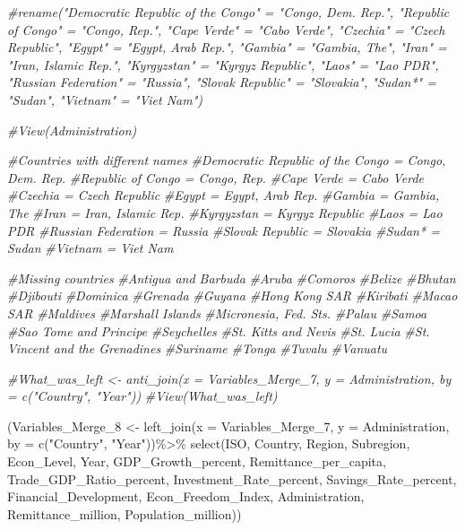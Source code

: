 \documentclass[
]{article}
\newenvironment{Shaded}{\begin{snugshade}}{\end{snugshade}}
\newcommand{\AttributeTok}[1]{\textcolor[rgb]{0.77,0.63,0.00}{#1}}
\newcommand{\CommentTok}[1]{\textcolor[rgb]{0.56,0.35,0.01}{\textit{#1}}}
\newcommand{\FunctionTok}[1]{\textcolor[rgb]{0.00,0.00,0.00}{#1}}
\newcommand{\NormalTok}[1]{#1}
\newcommand{\OtherTok}[1]{\textcolor[rgb]{0.56,0.35,0.01}{#1}}
\newcommand{\SpecialCharTok}[1]{\textcolor[rgb]{0.00,0.00,0.00}{#1}}
\newcommand{\StringTok}[1]{\textcolor[rgb]{0.31,0.60,0.02}{#1}}
\begin{document}
\begin{Shaded}
\begin{Highlighting}[]
\CommentTok{\#rename("Democratic Republic of the Congo" = "Congo, Dem. Rep.", "Republic of Congo" = "Congo, Rep.", "Cape Verde" = "Cabo Verde", "Czechia" = "Czech Republic", "Egypt" = "Egypt, Arab Rep.", "Gambia" = "Gambia, The", "Iran" = "Iran, Islamic Rep.", "Kyrgyzstan" = "Kyrgyz Republic", "Laos" = "Lao PDR", "Russian Federation" = "Russia", "Slovak Republic" = "Slovakia", "Sudan*" = "Sudan", "Vietnam" = "Viet Nam")}


\CommentTok{\#View(Administration)}


\CommentTok{\#Countries with different names}
\CommentTok{\#Democratic Republic of the Congo = Congo, Dem. Rep.}
\CommentTok{\#Republic of Congo = Congo, Rep.}
\CommentTok{\#Cape Verde = Cabo Verde}
\CommentTok{\#Czechia = Czech Republic}
\CommentTok{\#Egypt = Egypt, Arab Rep.}
\CommentTok{\#Gambia = Gambia, The}
\CommentTok{\#Iran = Iran, Islamic Rep.}
\CommentTok{\#Kyrgyzstan = Kyrgyz Republic}
\CommentTok{\#Laos = Lao PDR}
\CommentTok{\#Russian Federation = Russia}
\CommentTok{\#Slovak Republic = Slovakia}
\CommentTok{\#Sudan* = Sudan}
\CommentTok{\#Vietnam = Viet Nam}





\CommentTok{\#Missing countries}
\CommentTok{\#Antigua and Barbuda}
\CommentTok{\#Aruba}
\CommentTok{\#Comoros}
\CommentTok{\#Belize}
\CommentTok{\#Bhutan}
\CommentTok{\#Djibouti}
\CommentTok{\#Dominica}
\CommentTok{\#Grenada}
\CommentTok{\#Guyana}
\CommentTok{\#Hong Kong SAR}
\CommentTok{\#Kiribati}
\CommentTok{\#Macao SAR}
\CommentTok{\#Maldives}
\CommentTok{\#Marshall Islands}
\CommentTok{\#Micronesia, Fed. Sts.}
\CommentTok{\#Palau}
\CommentTok{\#Samoa}
\CommentTok{\#Sao Tome and Principe}
\CommentTok{\#Seychelles}
\CommentTok{\#St. Kitts and Nevis}
\CommentTok{\#St. Lucia}
\CommentTok{\#St. Vincent and the Grenadines}
\CommentTok{\#Suriname}
\CommentTok{\#Tonga}
\CommentTok{\#Tuvalu}
\CommentTok{\#Vanuatu}


\CommentTok{\#What\_was\_left \textless{}{-} anti\_join(x = Variables\_Merge\_7, y = Administration, by = c("Country", "Year"))}
\CommentTok{\#View(What\_was\_left)}


\NormalTok{(Variables\_Merge\_8 }\OtherTok{\textless{}{-}} \FunctionTok{left\_join}\NormalTok{(}\AttributeTok{x =}\NormalTok{ Variables\_Merge\_7, }\AttributeTok{y =}\NormalTok{ Administration, }\AttributeTok{by =} \FunctionTok{c}\NormalTok{(}\StringTok{"Country"}\NormalTok{, }\StringTok{"Year"}\NormalTok{))}\SpecialCharTok{\%\textgreater{}\%}
  \FunctionTok{select}\NormalTok{(ISO, Country, Region, Subregion, Econ\_Level, Year, GDP\_Growth\_percent, Remittance\_per\_capita, Trade\_GDP\_Ratio\_percent, Investment\_Rate\_percent, Savings\_Rate\_percent, Financial\_Development, Econ\_Freedom\_Index, Administration, Remittance\_million, Population\_million))}
\end{Highlighting}
\end{Shaded}
\end{document}
